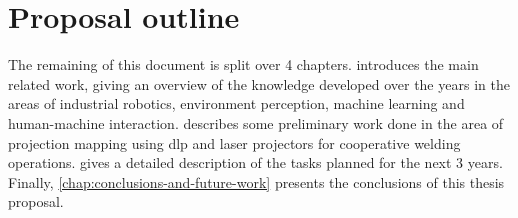 \section{Proposal outline}

The remaining of this document is split over 4 chapters.  introduces the main related work, giving an overview of the knowledge developed over the years in the areas of industrial robotics, environment perception, machine learning and human-machine interaction.  describes some preliminary work done in the area of projection mapping using \gls{dlp} and laser projectors for cooperative welding operations.  gives a detailed description of the tasks planned for the next 3 years. Finally, \cref{chap:conclusions-and-future-work} presents the conclusions of this thesis proposal.
